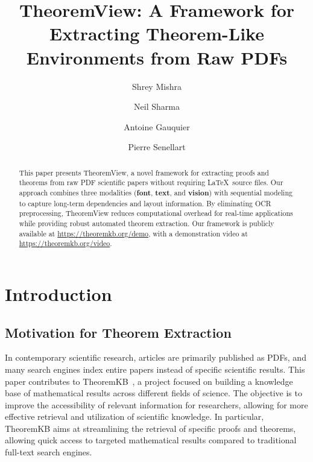 \documentclass[runningheads]{llncs}
\begin{document}
\title{TheoremView: A Framework for Extracting Theorem-Like Environments from Raw PDFs}

\author{Shrey Mishra \and
	Neil Sharma \and
	Antoine Gauquier \and
	Pierre Senellart}



\maketitle

\begin{abstract}
	This paper presents TheoremView, a novel framework for extracting proofs
	and theorems from raw PDF scientific papers without requiring
	\LaTeX~source files. Our approach combines three modalities
	(\textbf{font}, \textbf{text}, and \textbf{vision}) with sequential
	modeling to capture long-term dependencies and layout information. By
	eliminating OCR preprocessing, TheoremView reduces computational overhead
	for real-time applications while providing robust automated theorem
	extraction. Our framework is publicly available at
	\url{https://theoremkb.org/demo}, with a demonstration video at
	\url{https://theoremkb.org/video}.


\end{abstract}


\section{Introduction}
\subsection{Motivation for Theorem Extraction}
In contemporary scientific research, articles are primarily published as PDFs, and many
search engines index entire papers instead of specific scientific results. This paper
contributes to TheoremKB~\cite{sdp2024}, a project focused on building a knowledge base of mathematical
results across different fields of science. The objective is to improve the accessibility of
relevant information for researchers, allowing for more effective retrieval and utilization
of scientific knowledge. In particular, TheoremKB aims at streamlining
the retrieval of specific proofs and theorems, allowing quick access to
targeted mathematical results compared to traditional full-text search
engines.
\end{document}
